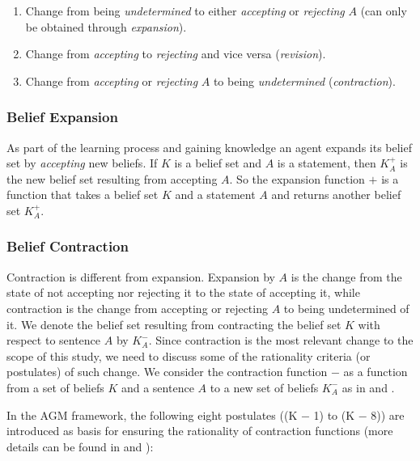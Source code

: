 \documentclass{sfuthesis}
\theoremstyle{plain}
\theoremstyle{definition}
\begin{document}
\begin{enumerate}
\item Change from being \textit{undetermined} to either \textit{accepting} or \textit{rejecting} $A$ (can only be obtained through \textit{expansion}).
\item Change from \textit{accepting} to \textit{rejecting} and vice versa (\textit{revision}).
\item Change from \textit{accepting} or \textit{rejecting} $A$ to being \textit{undetermined} (\textit{contraction})\cite{flux}.
\end{enumerate}

\subsubsection{Belief Expansion}
As part of the learning process and gaining knowledge an agent expands its belief set by \textit{accepting} new beliefs. If $K$ is a belief set and $A$ is a statement, then $K^{+}_{A}$ is the new belief set resulting from accepting $A$. So the expansion function $+$ is a function that takes a belief set $K$ and a statement $A$ and returns another belief set $K^{+}_{A}$. 

\subsubsection{Belief Contraction}
Contraction is different from expansion. Expansion by $A$ is the change from the state of not accepting nor rejecting it to the state of accepting it, while contraction is the change from accepting or rejecting $A$ to being undetermined of it. We denote the belief set resulting from contracting the belief set $K$ with respect to sentence $A$ by $K^{-}_{A}$. Since contraction is the most relevant change to the scope of this study, we need to discuss some of the rationality criteria (or postulates) of such change. We consider the contraction function $-$ as a function from a set of beliefs $K$ and a sentence $A$ to a new set of beliefs $K^{-}_{A}$ as in \cite{flux} and \cite{kr}. 

In the AGM framework, the following eight postulates ((K $-$ 1) to (K $-$ 8)) are introduced as basis for ensuring the rationality of contraction functions (more details can be found in \cite{kr} and \cite{flux}):
\end{document}
